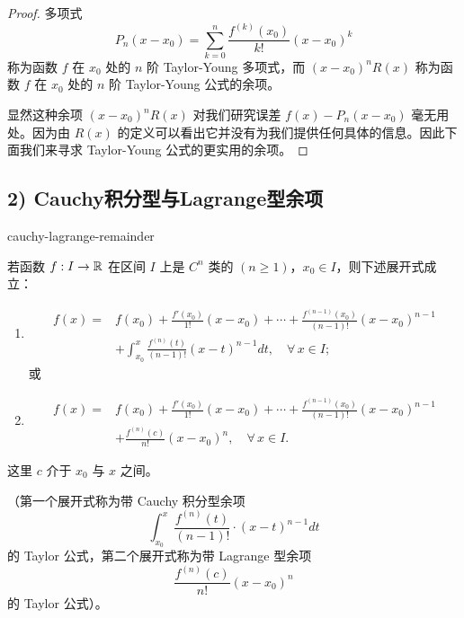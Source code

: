 \begin{proof}
多项式 \[P_n(x-x_0)=\sum_{k=0}^n\frac{f^{(k)}(x_0)}{k!}(x-x_0)^k\] 称为函数 $f$ 在 $x_0$ 处的 $n$ 阶 Taylor-Young 多项式，而 $(x-x_0)^nR(x)$ 称为函数 $f$ 在 $x_0$ 处的 $n$ 阶 Taylor-Young 公式的余项。

显然这种余项 $(x-x_0)^nR(x)$ 对我们研究误差 $f(x)-P_n(x-x_0)$ 毫无用处。因为由 $R(x)$ 的定义可以看出它并没有为我们提供任何具体的信息。因此下面我们来寻求 Taylor-Young 公式的更实用的余项。

\end{proof}

\subsection*{2) Cauchy积分型与Lagrange型余项}

\begin{mythm}{}{cauchy-lagrange-remainder}

若函数 $f:I\to\mathbb{R}$ 在区间 $I$ 上是 $C^n$ 类的 $(n\geqslant1)$，$x_0\in I$，则下述展开式成立：
\begin{enumerate}[label=\arabic{enumi})]
\item
\[\begin{aligned}
f(x)={}&f(x_0)+\frac{f'(x_0)}{1!}(x-x_0)+\cdots+\frac{f^{(n-1)}(x_0)}{(n-1)!}(x-x_0)^{n-1}\\
&+\int_{x_0}^{x}\frac{f^{(n)}(t)}{(n-1)!}(x-t)^{n-1}dt,\quad\forall\,x\in I;
\end{aligned}\]
或
\item
\[\begin{aligned}
f(x)={}&f(x_0)+\frac{f'(x_0)}{1!}(x-x_0)+\cdots+\frac{f^{(n-1)}(x_0)}{(n-1)!}(x-x_0)^{n-1}\\
&+\frac{f^{(n)}(c)}{n!}(x-x_0)^n,\quad\forall\,x\in I.
\end{aligned}\]
\end{enumerate}
这里 $c$ 介于 $x_0$ 与 $x$ 之间。

（第一个展开式称为带 Cauchy 积分型余项 \[\int_{x_0}^{x}\frac{f^{(n)}(t)}{(n-1)!}\cdot(x-t)^{n-1}dt\] 的 Taylor 公式，第二个展开式称为带 Lagrange 型余项 \[\frac{f^{(n)}(c)}{n!}(x-x_0)^n\] 的 Taylor 公式）。

\end{mythm}

